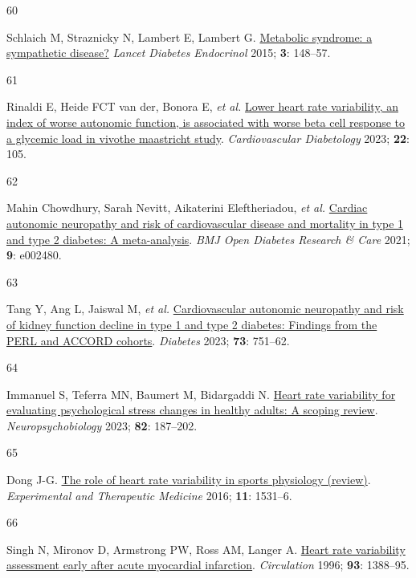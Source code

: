 \documentclass[
  a4paper,
  headsepline=true,
  open=left]{scrbook}
\newlength{\cslhangindent}
\newlength{\csllabelwidth}
\newlength{\cslentryspacingunit} %
\newenvironment{CSLReferences}[2] %
 {%
  \setlength{\parindent}{0pt}
  \ifodd #1
  \let\oldpar\par
  \def\par{\hangindent=\cslhangindent\oldpar}
  \fi
  \setlength{\parskip}{#2\cslentryspacingunit}
 }%
 {}
\newcommand{\CSLLeftMargin}[1]{\parbox[t]{\csllabelwidth}{#1}}
\newcommand{\CSLRightInline}[1]{\parbox[t]{\linewidth - \csllabelwidth}{#1}\break}
\begin{document}
\begin{CSLReferences}{0}{0}
\leavevmode{}%
\CSLLeftMargin{60 }%
\CSLRightInline{Schlaich M, Straznicky N, Lambert E, Lambert G.
\href{https://doi.org/10.1016/s2213-8587(14)70033-6}{Metabolic syndrome:
a sympathetic disease?} \emph{Lancet Diabetes Endocrinol} 2015;
\textbf{3}: 148--57.}

\leavevmode{}%
\CSLLeftMargin{61 }%
\CSLRightInline{Rinaldi E, Heide FCT van der, Bonora E, \emph{et al.}
\href{https://doi.org/10.1186/s12933-023-01837-0}{Lower heart rate
variability, an index of worse autonomic function, is associated with
worse beta cell response to a glycemic load in vivo{\textemdash}the
maastricht study}. \emph{Cardiovascular Diabetology} 2023; \textbf{22}:
105.}

\leavevmode{}%
\CSLLeftMargin{62 }%
\CSLRightInline{Mahin Chowdhury, Sarah Nevitt, Aikaterini Eleftheriadou,
\emph{et al.} \href{https://doi.org/10.1136/bmjdrc-2021-002480}{Cardiac
autonomic neuropathy and risk of cardiovascular disease and mortality in
type 1 and type 2 diabetes: A meta-analysis}. \emph{BMJ Open Diabetes
Research \& Care} 2021; \textbf{9}: e002480.}

\leavevmode{}%
\CSLLeftMargin{63 }%
\CSLRightInline{Tang Y, Ang L, Jaiswal M, \emph{et al.}
\href{https://doi.org/10.2337/db23-0247}{Cardiovascular autonomic
neuropathy and risk of kidney function decline in type 1 and type 2
diabetes: Findings from the PERL and ACCORD cohorts}. \emph{Diabetes}
2023; \textbf{73}: 751--62.}

\leavevmode{}%
\CSLLeftMargin{64 }%
\CSLRightInline{Immanuel S, Teferra MN, Baumert M, Bidargaddi N.
\href{https://doi.org/10.1159/000530376}{Heart rate variability for
evaluating psychological stress changes in healthy adults: A scoping
review}. \emph{Neuropsychobiology} 2023; \textbf{82}: 187--202.}

\leavevmode{}%
\CSLLeftMargin{65 }%
\CSLRightInline{Dong J-G.
\href{https://doi.org/10.3892/etm.2016.3104}{The role of heart rate
variability in sports physiology (review)}. \emph{Experimental and
Therapeutic Medicine} 2016; \textbf{11}: 1531--6.}

\leavevmode{}%
\CSLLeftMargin{66 }%
\CSLRightInline{Singh N, Mironov D, Armstrong PW, Ross AM, Langer A.
\href{https://doi.org/10.1161/01.CIR.93.7.1388}{Heart rate variability
assessment early after acute myocardial infarction}. \emph{Circulation}
1996; \textbf{93}: 1388--95.}


\end{CSLReferences}
\end{document}
